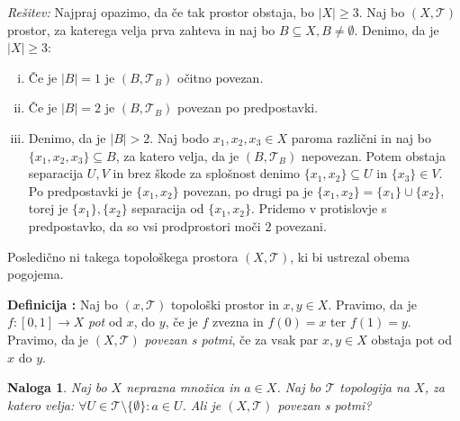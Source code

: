 \documentclass[a4paper, 10pt]{article}
\newtheorem{nal}{Naloga}
\newcounter{defcount}
\newenvironment{definicija}{\begin{flushleft}\stepcounter{defcount}\textbf{Definicija \arabic{defcount}:}}{\hfill\end{flushleft}}
\newenvironment{resitev}{\begin{flushleft}\textit{Rešitev:}}{\hfill\end{flushleft}}
\newcommand{\abs}[1]{\ensuremath{\lvert #1 \rvert}}
\newcommand{\pojem}[1]{\emph{#1}}
\newcommand{\map}[3]{\ensuremath{{#1}: {#2} \rightarrow {#3}}}
\begin{document}
	\begin{resitev}
		Najpraj opazimo, da če tak prostor obstaja, bo $\abs{X}\geq 3$. Naj bo $(X, \mathcal{T})$ prostor, za katerega velja prva zahteva in naj bo $B\subseteq X, B\neq\emptyset$. Denimo, da je $\abs{X}\geq 3$: \begin{enumerate}[i)]
			\item Če je $\abs{B}=1$ je $(B, \mathcal{T}_B)$ očitno povezan.
			\item Če je $\abs{B}=2$ je $(B, \mathcal{T}_B)$ povezan po predpostavki.
			\item Denimo, da je $\abs{B}>2$. Naj bodo $x_1, x_2, x_3 \in X$ paroma različni in naj bo $\{x_1, x_2, x_3\}\subseteq B$, za katero velja, da je $(B, \mathcal{T}_B)$ nepovezan. Potem obstaja separacija $U, V$ in brez škode za splošnost denimo $\{x_1, x_2\}\subseteq U$ in $\{x_3\}\in V$. Po predpostavki je $\{x_1, x_2\}$ povezan, po drugi pa je $\{x_1, x_2\} = \{x_1\}\cup \{x_2\}$, torej je $\{x_1\},\{x_2\}$ separacija od $\{x_1, x_2\}$. Pridemo v protislovje s predpostavko, da so vsi prodprostori moči $2$ povezani.
		\end{enumerate}
		Posledično ni takega topološkega prostora $(X, \mathcal{T})$, ki bi ustrezal obema pogojema.
	\end{resitev}
	\begin{definicija}
		Naj bo $(x, \mathcal{T})$ topološki prostor in $x, y\in X$. Pravimo, da je $\map{f}{[0, 1]}{X}$ \pojem{pot} od $x$, do $y$, če je $f$ zvezna in $f(0) = x$ ter $f(1) = y$. Pravimo, da je $(X, \mathcal{T})$ \pojem{povezan s potmi}, če za vsak par $x, y\in X$ obstaja pot od $x$ do $y$.
	\end{definicija}
	\begin{nal}
		Naj bo $X$ neprazna množica in $a\in X$. Naj bo $\mathcal{T}$ topologija na $X$, za katero velja: $\forall U \in \mathcal{T}\setminus\{\emptyset\}: a\in U$. Ali je $(X, \mathcal{T})$ povezan s potmi?
	\end{nal}
\end{document}
